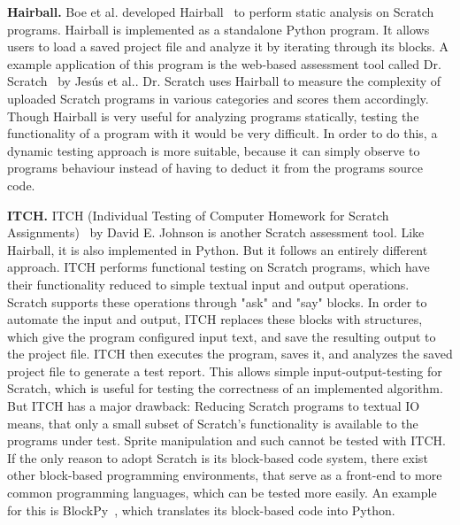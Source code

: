 \textbf{Hairball.}
Boe et al. developed Hairball~\cite{hairball} to perform static analysis on Scratch programs.
Hairball is implemented as a standalone Python program.
It allows users to load a saved project file and analyze it by iterating through its blocks.
A example application of this program is the web-based assessment tool called Dr. Scratch~\cite{drscratch} by Jes\'{u}s et al..
Dr. Scratch uses Hairball to measure the complexity of uploaded Scratch programs in various categories and scores them accordingly.
Though Hairball is very useful for analyzing programs statically, testing the functionality of a program with it would be very difficult.
In order to do this, a dynamic testing approach is more suitable, because it can simply observe to programs behaviour instead of having to deduct it from the programs source code.
\parspace

\textbf{ITCH.}
ITCH (Individual Testing of Computer Homework for Scratch Assignments)~\cite{itch} by David E. Johnson is another Scratch assessment tool.
Like Hairball, it is also implemented in Python.
But it follows an entirely different approach.
ITCH performs functional testing on Scratch programs, which have their functionality reduced to simple textual input and output operations.
Scratch supports these operations through "ask" and "say" blocks.
In order to automate the input and output, ITCH replaces these blocks with structures, which give the program configured input text, and save the resulting output to the project file.
ITCH then executes the program, saves it, and analyzes the saved project file to generate a test report.
This allows simple input-output-testing for Scratch, which is useful for testing the correctness of an implemented algorithm.
But ITCH has a major drawback: Reducing Scratch programs to textual IO means, that only a small subset of Scratch's functionality is available to the programs under test.
Sprite manipulation and such cannot be tested with ITCH.
If the only reason to adopt Scratch is its block-based code system, there exist other block-based programming environments, that serve as a front-end to more common programming languages, which can be tested more easily.
An example for this is BlockPy~\cite{blockpy}, which translates its block-based code into Python.

